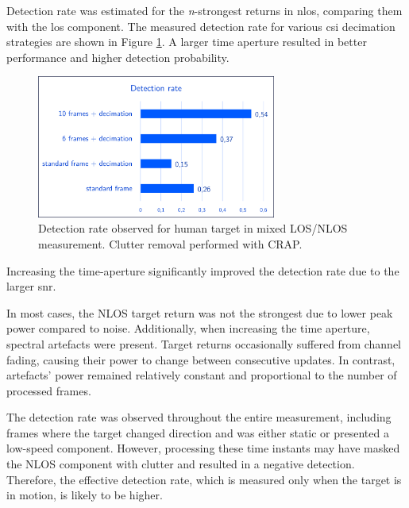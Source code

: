 Detection rate was estimated for the \textit{n}-strongest returns in \gls{nlos}, comparing them with the \gls{los} component.
The measured detection rate for various \gls{csi} decimation strategies are shown in Figure \ref{fig:Test1_detect_hist}. A larger time aperture resulted in better performance and higher detection probability.

\begin{figure}[H]
	\centering
	\includegraphics[width=0.7\textwidth]{Images/Test1/detect_hist/detect_hist_human_LMsans.png}
	\caption{Detection rate observed for human target in mixed LOS/NLOS measurement. Clutter removal performed with CRAP.}
	\label{fig:Test1_detect_hist}
\end{figure}

Increasing the time-aperture significantly improved the detection rate due to the larger \gls{snr}.

In most cases, the NLOS target return was not the strongest due to lower peak power compared to noise. Additionally, when increasing the time aperture, spectral artefacts were present.
Target returns occasionally suffered from channel fading, causing their power to change between consecutive updates. In contrast, artefacts' power remained relatively constant and proportional to the number of processed frames.

The detection rate was observed throughout the entire measurement, including frames where the target changed direction and was either static or presented a low-speed component. However, processing these time instants may have masked the NLOS component with clutter and resulted in a negative detection. Therefore, the effective detection rate, which is measured only when the target is in motion, is likely to be higher.







